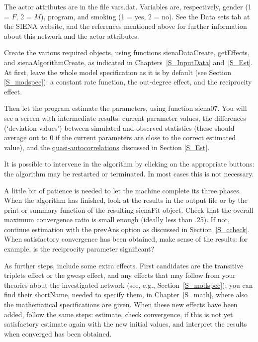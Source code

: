 \documentclass[a4paper,fleqn,11pt]{article}
\newcommand{\+}{\, + \,}
\newcommand{\sfn}[1]{\textsf{#1}}
\newcommand{\SI}{{\sf SIENA }}
\begin{document}
The actor attributes are in the file {\sf vars.dat}. Variables
are, respectively, gender (1 = $F$, 2 = $M$), program, and smoking
(1 = yes, 2 = no). See the \sfn{Data sets} tab at the
\SI website, and the references mentioned above for further
information about this network and the actor attributes.

Create the various required objects, using functions
\textsf{sienaDataCreate}, \textsf{getEffects}, and \textsf{sienaAlgorithmCreate},
as indicated in Chapters~\ref{S_InputData} and~\ref{S_Est}.
At first, leave the whole model specification as
it is by default (see Section \ref{S_modspec}):
a constant rate function, the out-degree effect, and
the reciprocity effect.

Then let the program estimate the parameters, using function \textsf{siena07}.
You will see a
screen with intermediate results: current parameter values, the
differences (`deviation values') between simulated and observed
statistics (these should average out to 0 if the current
parameters are close to the correct estimated value), and the
\hyperlink{T_quasiac}{quasi-autocorrelations} discussed in Section
\ref{S_Est}.

It is possible to intervene in the algorithm by clicking on the
appropriate buttons:
the algorithm may be restarted or terminated. In most cases
this is not necessary.

A little bit of patience is needed to let the machine complete its three
phases.
When the algorithm has finished, look at the results in the output file
or by the \sfn{print} or \sfn{summary} function of the
resulting \sfn{sienaFit} object. Check
that the overall maximum convergence ratio is small enough
(ideally less than .25).
If not, continue estimation with the \sfn{prevAns} option
as discussed in Section~\ref{S_ccheck}.
When satisfactory convergence has been obtained, make sense
of the results: for example, is the reciprocity parameter significant?

As further steps, include some extra effects. First candidates
are the transitive triplets effect or the gwesp effect, and any
effects that may follow from your theories about the investigated network
(see, e.g., Section~\ref{S_modspec});
you can find their \sfn{shortName},
needed to specify them, in Chapter~\ref{S_math},
where also the mathematical specifications are given.
When these new effects have been added, follow the same steps:
estimate, check convergence, if this is not yet satisfactory
estimate again with the new initial values, and interpret the
results when converged has been obtained.
\end{document}
